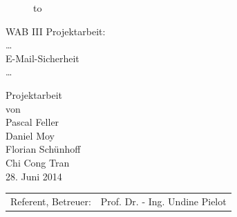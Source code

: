 \begin{titlepage}
\begin{figure}
  \begin{center}
    \hbox to 
  \end{center}
\end{figure}

\begin{center}
\rule{0pt}{0pt}
\vfill
\vfill
\vfill
\vfill

\begin{huge}
WAB III Projektarbeit:\\[0.75ex]
\dots\\[0.75ex]
E-Mail-Sicherheit\\[0.75ex]
\dots\\[0.75ex]
\end{huge}

\vfill
\vfill

Projektarbeit\\ von\\

\vspace*{.5cm}
Pascal Feller\\
Daniel Moy\\
Florian Schünhoff\\
Chi Cong Tran\\
\vspace{.5cm}
28. Juni 2014\\

\vfill
\vfill
\vfill
\vfill

\begin{tabular}{rl}
Referent, Betreuer:   & Prof. Dr. - Ing. Undine Pielot\\
\end{tabular}
\end{center}
\end{titlepage}



